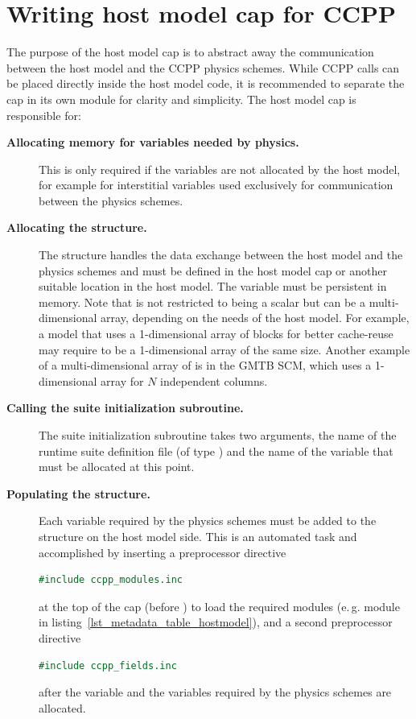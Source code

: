 \section{Writing host model cap for CCPP}
\label{sec_hostmodel_cap}
The purpose of the host model cap is to abstract away the communication between the host model and the CCPP physics schemes. While CCPP calls can be placed directly inside the host model code, it is recommended to separate the cap in its own module for clarity and simplicity. The host model cap is responsible for:
\begin{description}
\item[\textbf{Allocating memory for variables needed by physics.}] This is only required if the variables are not allocated by the host model, for example for interstitial variables used exclusively for communication between the physics schemes.
\item[\textbf{Allocating the  structure.}] The  structure handles the data exchange between the host model and the physics schemes and must be defined in the host model cap or another suitable location in the host model. The  variable must be persistent in memory. Note that  is not restricted to being a scalar but can be a multi-dimensional array, depending on the needs of the host model. For example, a model that uses a 1-dimensional array of blocks for better cache-reuse may require  to be a 1-dimensional array of the same size. Another example of a multi-dimensional array of  is in the GMTB SCM, which uses a 1-dimensional  array for $N$ independent columns.
\item[\textbf{Calling the suite initialization subroutine.}] The suite initialization subroutine takes two arguments, the name of the runtime suite definition file (of type ) and the name of the  variable that must be allocated at this point.
\item[\textbf{Populating the  structure.}] Each variable required by the physics schemes must be added to the  structure on the host model side. This is an automated task and accomplished by inserting a preprocessor directive
\begin{lstlisting}[language=Fortran]
#include ccpp_modules.inc
\end{lstlisting}
at the top of the cap (before ) to load the required modules (e.\,g. module  in listing~\ref{lst_metadata_table_hostmodel}), and a second preprocessor directive
\begin{lstlisting}[language=Fortran]
#include ccpp_fields.inc
\end{lstlisting}
after the  variable and the variables required by the physics schemes are allocated.


\end{description}
